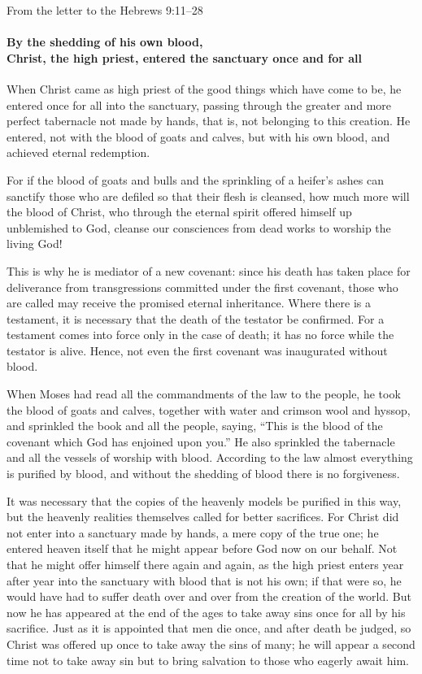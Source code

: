 From the letter to the Hebrews \hfill 9:11--28

\paragraph{By the shedding of his own blood, \\Christ, the high priest, entered the sanctuary once and for all}

\lettrine[lines=3]{W}{}hen Christ came as high priest of the good things which have come to be, he entered once for all into the sanctuary, passing through the greater and more perfect tabernacle not made by hands, that is, not belonging to this creation. He entered, not with the blood of goats and calves, but with his own blood, and achieved eternal redemption.

For if the blood of goats and bulls and the sprinkling of a heifer’s ashes can sanctify those who are defiled so that their flesh is cleansed, how much more will the blood of Christ, who through the eternal spirit offered himself up unblemished to God, cleanse our consciences from dead works to worship the living God!

This is why he is mediator of a new covenant: since his death has taken place for deliverance from transgressions committed under the first covenant, those who are called may receive the promised eternal inheritance. Where there is a testament, it is necessary that the death of the testator be confirmed. For a testament comes into force only in the case of death; it has no force while the testator is alive. Hence, not even the first covenant was inaugurated without blood.

When Moses had read all the commandments of the law to the people, he took the blood of goats and calves, together with water and crimson wool and hyssop, and sprinkled the book and all the people, saying, “This is the blood of the covenant which God has enjoined upon you.” He also sprinkled the tabernacle and all the vessels of worship with blood. According to the law almost everything is purified by blood, and without the shedding of blood there is no forgiveness.

It was necessary that the copies of the heavenly models be purified in this way, but the heavenly realities themselves called for better sacrifices. For Christ did not enter into a sanctuary made by hands, a mere copy of the true one; he entered heaven itself that he might appear before God now on our behalf. Not that he might offer himself there again and again, as the high priest enters year after year into the sanctuary with blood that is not his own; if that were so, he would have had to suffer death over and over from the creation of the world. But now he has appeared at the end of the ages to take away sins once for all by his sacrifice. Just as it is appointed that men die once, and after death be judged, so Christ was offered up once to take away the sins of many; he will appear a second time not to take away sin but to bring salvation to those who eagerly await him.

